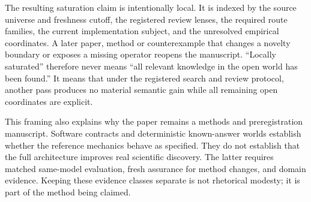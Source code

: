 The resulting saturation claim is intentionally local. It is indexed by the source universe and freshness cutoff, the registered review lenses, the required route families, the current implementation subject, and the unresolved empirical coordinates. A later paper, method or counterexample that changes a novelty boundary or exposes a missing operator reopens the manuscript. ``Locally saturated'' therefore never means ``all relevant knowledge in the open world has been found.'' It means that under the registered search and review protocol, another pass produces no material semantic gain while all remaining open coordinates are explicit.

This framing also explains why the paper remains a methods and preregistration manuscript. Software contracts and deterministic known-answer worlds establish whether the reference mechanics behave as specified. They do not establish that the full architecture improves real scientific discovery. The latter requires matched same-model evaluation, fresh assurance for method changes, and domain evidence. Keeping these evidence classes separate is not rhetorical modesty; it is part of the method being claimed.
